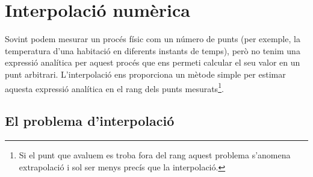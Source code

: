 \documentclass[../Apunts.tex]{subfiles}
\begin{document}
	\chapter{Interpolació numèrica}%
	Sovint podem mesurar un procés físic com un número de punts (per exemple, la temperatura d'una habitació en diferents instants de temps), però no tenim una expressió analítica per aquest procés que ens permeti calcular el seu valor en un punt arbitrari. L'interpolació ens proporciona un mètode simple per estimar aquesta expressió analítica en el rang dels punts mesurats\footnote{Si el punt que avaluem es troba fora del rang aquest problema s'anomena extrapolació i sol ser menys precís que la interpolació.}.
	\section{El problema d'interpolació}
\end{document}
